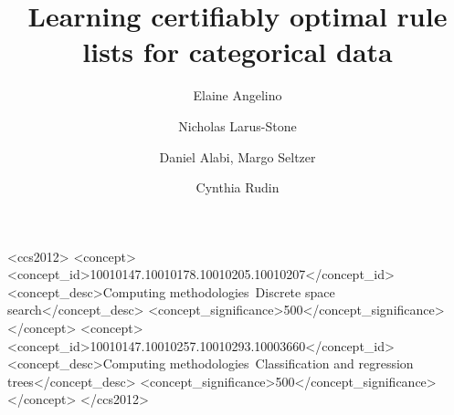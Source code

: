 \documentclass[sigconf]{acmart}
\begin{document}
\title{Learning certifiably optimal rule lists for categorical data}

\author{Elaine Angelino}

%
%

\author{Nicholas Larus-Stone}
\author{Daniel Alabi, Margo Seltzer}

\author{Cynthia Rudin}

\renewcommand{\shortauthors}{E. Angelino et al.}


\begin{abstract}

\end{abstract}

\setlength{\abovedisplayskip}{3pt}
\setlength{\belowdisplayskip}{3pt}
\setlength{\belowcaptionskip}{-10pt}

%
%
\begin{CCSXML}
<ccs2012>
<concept>
<concept_id>10010147.10010178.10010205.10010207</concept_id>
<concept_desc>Computing methodologies~Discrete space search</concept_desc>
<concept_significance>500</concept_significance>
</concept>
<concept>
<concept_id>10010147.10010257.10010293.10003660</concept_id>
<concept_desc>Computing methodologies~Classification and regression trees</concept_desc>
<concept_significance>500</concept_significance>
</concept>
</ccs2012>
\end{CCSXML}
\end{document}
